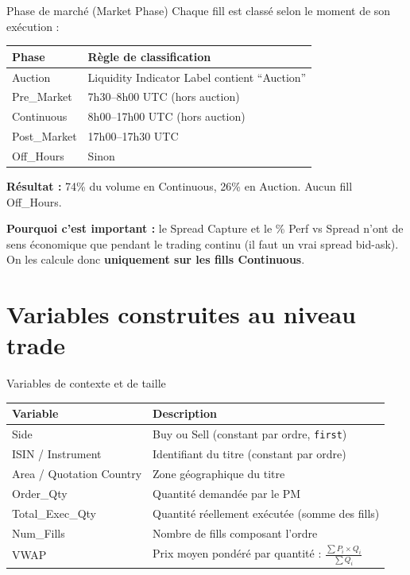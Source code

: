 \documentclass[10pt]{beamer}
\begin{document}
\begin{frame}{Phase de marché (Market Phase)}
Chaque fill est classé selon le moment de son exécution :

\vspace{0.3cm}
\begin{tabular}{ll}
\toprule
\textbf{Phase} & \textbf{Règle de classification} \\
\midrule
Auction & Liquidity Indicator Label contient ``Auction'' \\
Pre\_Market & 7h30--8h00 UTC (hors auction) \\
Continuous & 8h00--17h00 UTC (hors auction) \\
Post\_Market & 17h00--17h30 UTC \\
Off\_Hours & Sinon \\
\bottomrule
\end{tabular}

\vspace{0.3cm}
\textbf{Résultat :} 74\% du volume en Continuous, 26\% en Auction. Aucun fill Off\_Hours.

\vspace{0.3cm}
\textbf{Pourquoi c'est important :} le Spread Capture et le \% Perf vs Spread n'ont de sens économique que pendant le trading continu (il faut un vrai spread bid-ask). On les calcule donc \textbf{uniquement sur les fills Continuous}.
\end{frame}

\section{Variables construites au niveau trade}

\begin{frame}{Variables de contexte et de taille}
\begin{tabular}{lp{7cm}}
\toprule
\textbf{Variable} & \textbf{Description} \\
\midrule
Side & Buy ou Sell (constant par ordre, \texttt{first}) \\
ISIN / Instrument & Identifiant du titre (constant par ordre) \\
Area / Quotation Country & Zone géographique du titre \\
Order\_Qty & Quantité demandée par le PM \\
Total\_Exec\_Qty & Quantité réellement exécutée (somme des fills) \\
Num\_Fills & Nombre de fills composant l'ordre \\
VWAP & Prix moyen pondéré par quantité : $\frac{\sum P_i \times Q_i}{\sum Q_i}$ \\
\bottomrule
\end{tabular}
\end{frame}
\end{document}
